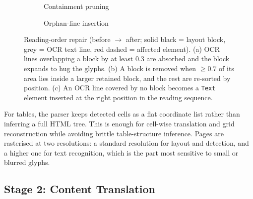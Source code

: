 \begin{figure}[H]
\begin{subfigure}[t]{0.32\textwidth}
  \caption{Containment pruning}
  \end{subfigure}\hfill
  \begin{subfigure}[t]{0.32\textwidth}\centering
  \caption{Orphan-line insertion}
  \end{subfigure}
  \caption{Reading-order repair (before $\rightarrow$ after; solid black = layout
  block, grey = OCR text line, red dashed = affected element). (a) OCR lines
  overlapping a block by at least $0.3$ are absorbed and the block expands to hug
  the glyphs. (b) A block is removed when $\ge 0.7$ of its area lies inside a
  larger retained block, and the rest are re-sorted by position. (c) An OCR line
  covered by no block becomes a \texttt{Text} element inserted at the right
  position in the reading sequence.}
  \label{fig:reading-order}
\end{figure}

For tables, the parser keeps detected cells as a flat coordinate list rather
than inferring a full HTML tree. This is enough
for cell-wise translation and
grid reconstruction while avoiding brittle table-structure inference. Pages are
rasterised at two resolutions: a standard resolution for layout and detection,
and a higher one for text recognition, which is the part most sensitive to small
or blurred glyphs.

\subsection{Stage 2: Content Translation}
\label{subsec:method-translate}

